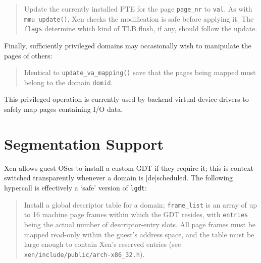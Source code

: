 \documentclass[11pt,twoside,final,openright]{report}
\begin{document}
\begin{quote} 

Update the currently installed PTE for the page {\tt page\_nr} to 
{\tt val}. As with {\tt mmu\_update()}, Xen checks the modification 
is safe before applying it. The {\tt flags} determine which kind
of TLB flush, if any, should follow the update. 

\end{quote} 

Finally, sufficiently privileged domains may occasionally wish to manipulate 
the pages of others: 
\begin{quote}


Identical to {\tt update\_va\_mapping()} save that the pages being
mapped must belong to the domain {\tt domid}. 

\end{quote}

This privileged operation is currently used by backend virtual device
drivers to safely map pages containing I/O data. 



\section{Segmentation Support}

Xen allows guest OSes to install a custom GDT if they require it; 
this is context switched transparently whenever a domain is 
[de]scheduled.  The following hypercall is effectively a 
`safe' version of {\tt lgdt}: 

\begin{quote}

Install a global descriptor table for a domain; {\tt frame\_list} is
an array of up to 16 machine page frames within which the GDT resides,
with {\tt entries} being the actual number of descriptor-entry
slots. All page frames must be mapped read-only within the guest's
address space, and the table must be large enough to contain Xen's
reserved entries (see {\tt xen/include/public/arch-x86\_32.h}).

\end{quote}
\end{document}

